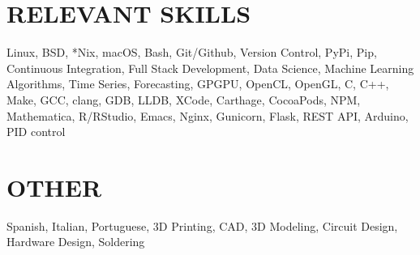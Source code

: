 \documentclass[margin]{res}
\begin{document}
\begin{resume}
  \section{RELEVANT SKILLS}
  Linux, BSD, *Nix, macOS, Bash, Git/Github, Version Control, PyPi, Pip, Continuous Integration,
  Full Stack Development, Data Science, Machine Learning Algorithms, Time Series, Forecasting,
  GPGPU, OpenCL, OpenGL, C, C++, Make, GCC, clang, GDB, LLDB, XCode, Carthage,
  CocoaPods, NPM, Mathematica, R/RStudio, Emacs, Nginx, Gunicorn, Flask, REST API, Arduino, PID control

  \section{OTHER}
  Spanish, Italian, Portuguese, 3D Printing, CAD, 3D Modeling, Circuit Design,
  Hardware Design, Soldering 
 
\end{resume}
\end{document}
